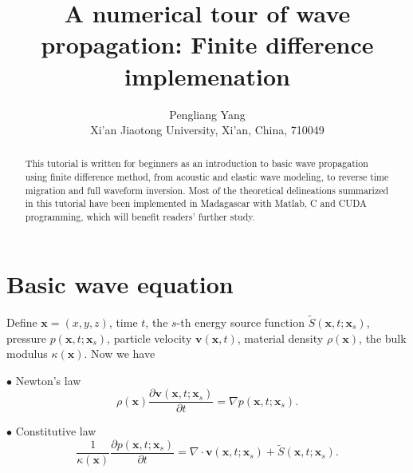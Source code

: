 

\title{A numerical tour of wave propagation: Finite difference implemenation}
\renewcommand{\thefootnote}{\fnsymbol{footnote}}
\author{Pengliang Yang\footnotemark[1]\\
\footnotemark[1]Xi'an Jiaotong University, Xi'an, China, 710049
}
\usetikzlibrary{decorations.pathreplacing} 
\usetikzlibrary{scopes}


\maketitle
\begin{abstract}
 This tutorial is written for beginners as an introduction to basic wave propagation using finite difference method, from acoustic and elastic wave modeling, to reverse time migration and full waveform inversion. Most of the theoretical delineations summarized in this tutorial have been implemented in Madagascar with Matlab, C and CUDA programming, which will benefit readers' further study.
\end{abstract}

\section{Basic wave equation}

Define  $\textbf{x}=(x,y,z)$, time $t$, the $s$-th energy source function $ \tilde{S}(\textbf{x},t;\textbf{x}_s) $, pressure $p(\textbf{x},t; \textbf{x}_s)$, particle velocity $ \textbf{v}(\textbf{x},t) $, material density $ \rho(\textbf{x}) $, the bulk modulus $\kappa(\textbf{x})$. Now we have
\begin{description}
	\item $\bullet$ Newton's law
	\begin{equation}\label{eq:newton}
	\rho(\textbf{x})\frac{\partial\textbf{v}(\textbf{x},t;\textbf{x}_s)}{\partial t}=\nabla p(\textbf{x},t;\textbf{x}_s).
	\end{equation}

	\item $\bullet$ Constitutive law
	\begin{equation}\label{eq:constitutive}
	\frac{1}{\kappa(\textbf{x})}\frac{\partial p(\textbf{x},t;\textbf{x}_s)}{\partial t}=\nabla \cdot \textbf{v}(\textbf{x},t;\textbf{x}_s)+\tilde{S}(\textbf{x},t;\textbf{x}_s).
	\end{equation}
\end{description}

